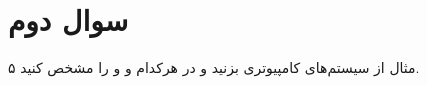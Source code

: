 \section{سوال دوم}

۵ مثال از سیستم‌های کامپیوتری بزنید و در هرکدام  و  و  را مشخص کنید.


\begin{qsolve}[]

\end{qsolve}
